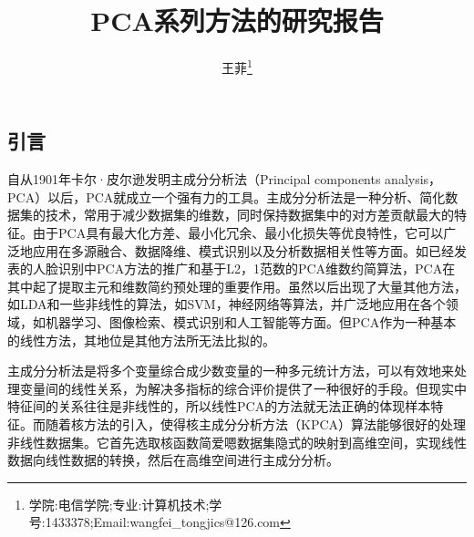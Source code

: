 \documentclass[10pt,a4paper]{article}
\begin{document}
\begin{CJK*}{UTF8}{song}

\renewcommand\contentsname{目录}




\newpage
\pagestyle{fancy} 
\lhead{}
\rhead{}
\tableofcontents
{}



\newpage

\pagestyle{fancy} 
\lhead{}
\rhead{}
\title{PCA系列方法的研究报告}					%
\author{王菲\thanks{学院:电信学院;\;专业:计算机技术;\;学号:1433378;\;Email:wangfei\_tongjics@126.com}}									%
\date{}                                             				%
\maketitle                                          				%


\section{引言}
自从1901年卡尔·皮尔逊发明主成分分析法\cite{1}（Principal components analysis，PCA）以后，PCA就成立一个强有力的工具。主成分分析法是一种分析、简化数据集的技术，常用于减少数据集的维数，同时保持数据集中的对方差贡献最大的特征。由于PCA具有最大化方差、最小化冗余、最小化损失等优良特性，它可以广泛地应用在多源融合、数据降维、模式识别以及分析数据相关性等方面。如已经发表的人脸识别中PCA方法的推广\cite{3}和基于L2，1范数的PCA维数约简算法\cite{4}，PCA在其中起了提取主元和维数简约预处理的重要作用。虽然以后出现了大量其他方法，如LDA和一些非线性的算法，如SVM，神经网络等算法，并广泛地应用在各个领域，如机器学习、图像检索、模式识别和人工智能等方面。但PCA作为一种基本的线性方法，其地位是其他方法所无法比拟的。


主成分分析法是将多个变量综合成少数变量的一种多元统计方法，可以有效地来处理变量间的线性关系，为解决多指标的综合评价提供了一种很好的手段。但现实中特征间的关系往往是非线性的，所以线性PCA的方法就无法正确的体现样本特征。而随着核方法的引入，使得核主成分分析方法\cite{5}（KPCA）算法能够很好的处理非线性数据集。它首先选取核函数简爱嗯数据集隐式的映射到高维空间，实现线性数据向线性数据的转换，然后在高维空间进行主成分分析。



\end{CJK*}
\end{document}
